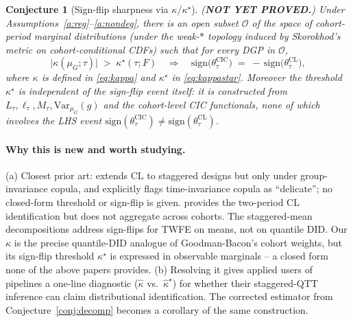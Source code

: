 \documentclass[11pt]{article}
\theoremstyle{definition}
\theoremstyle{plain}
\newtheorem{conjecture}{Conjecture}
\theoremstyle{remark}
\begin{document}
\begin{conjecture}[Sign-flip sharpness via $\kappa$/$\kappa^\star$]\label{conj:signflip}
(\textbf{NOT YET PROVED.}) Under Assumptions~\ref{a:reg}--\ref{a:nondeg}, there is an open subset $\mathcal{O}$ of the space of cohort-period marginal distributions (under the weak-$*$ topology induced by Skorokhod's metric on cohort-conditional CDFs) such that for every DGP in $\mathcal{O}$,
\[
  \big|\kappa(\mu_G; \tau)\big| \;>\; \kappa^\star(\tau; F)
  \quad \Longrightarrow \quad
  \mathrm{sign}\!\big(\theta^{\mathrm{CIC}}_\tau\big) \;=\; -\,\mathrm{sign}\!\big(\theta^{\mathrm{CL}}_\tau\big),
\]
where $\kappa$ is defined in \eqref{eq:kappa} and $\kappa^\star$ in \eqref{eq:kappastar}. Moreover the threshold $\kappa^\star$ is independent of the sign-flip event itself: it is constructed from $L_\tau, \ell_\tau, M_\tau, \mathrm{Var}_{\mu_G}(g)$ and the cohort-level CIC functionals, none of which involves the LHS event $\mathrm{sign}(\theta^{\mathrm{CIC}}_\tau) \ne \mathrm{sign}(\theta^{\mathrm{CL}}_\tau)$.
\end{conjecture}

\paragraph{Why this is new and worth studying.}
(a) Closest prior art: \cite{LiLin2024} extends CL to staggered designs but only under group-invariance copula, and explicitly flags time-invariance copula as ``delicate''; no closed-form threshold or sign-flip is given. \cite{CallawayLi2019} provides the two-period CL identification but does not aggregate across cohorts. The staggered-mean decompositions \cite{GoodmanBacon2021, SunAbraham2021, deChaisemartinDHaultfoeuille2020} address sign-flips for TWFE on means, not on quantile DID. Our $\kappa$ is the precise quantile-DID analogue of Goodman-Bacon's cohort weights, but its sign-flip threshold $\kappa^\star$ is expressed in observable marginals -- a closed form none of the above papers provides.
(b) Resolving it gives applied users of \cite{CallawayLi2019, LiLin2024} pipelines a one-line diagnostic ($\hat\kappa$ vs.\ $\hat\kappa^\star$) for whether their staggered-QTT inference can claim distributional identification. The corrected estimator from Conjecture~\ref{conj:decomp} becomes a corollary of the same construction.
\end{document}
